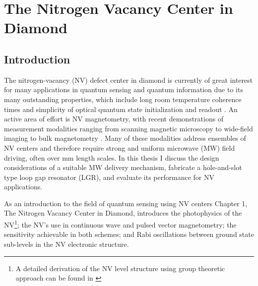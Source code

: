 
\chapter{The Nitrogen Vacancy Center in Diamond}

\section{Introduction}

The nitrogen-vacancy (NV) defect center in diamond is currently of great interest for many applications in quantum sensing \cite{taylor2008high,balasubramanian2008nanoscale,dolde2011electric,neumann2013high, degen2008scanning,hodges2013timekeeping} and quantum information \cite{childress2013diamond,gaebel2006room,dutt2007quantum} due to its many outstanding properties, which include long room temperature coherence times \cite{balasubramanian2008nanoscale} and simplicity of optical quantum state initialization and readout \cite{schirhagl2014nitrogen,jensen2017magnetometry}. An active area of effort is NV magnetometry, with recent demonstrations of measurement modalities ranging from scanning magnetic microscopy \cite{degen2008scanning} to wide-field imaging \cite{pham2011magnetic} to bulk magnetometry \cite{wolf2015subpicotesla}. Many of these modalities address ensembles of NV centers and therefore require strong and uniform microwave (MW) field driving, often over mm length scales. In this thesis I discuss the design considerations of a suitable MW delivery mechanism, fabricate a hole-and-slot type loop gap resonator (LGR), and evaluate its performance for NV applications. 

As an introduction to the field of quantum sensing using NV centers Chapter 1, The Nitrogen Vacancy Center in Diamond, introduces the photophysics of the NV\footnote{A detailed derivation of the NV level structure using group theoretic approach can be found in \cite{doherty2012theory, doherty2013thenitrogen, maze2011properties} }; the NV's use in continuous wave and pulsed vector magnetometry; the sensitivity achievable in both schemes; and Rabi oscillations between ground state sub-levels in the NV electronic structure.

